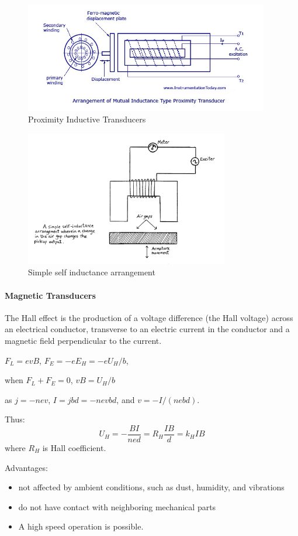 \begin{figure}
  \centering
  \includegraphics[width=4.2in]{fig/Proximity-Inductive-Transduccers.jpg}
  \caption{Proximity Inductive Transducers}\label{fig_proximity_inductive}
\end{figure}


\begin{figure}
  \centering
  \includegraphics[width=3.5in]{fig/Image22.png}
  \caption{Simple self inductance arrangement}\label{fig_inductance}
\end{figure}

\paragraph{Magnetic Transducers}
The Hall effect is the production of a voltage difference (the Hall voltage) across an electrical conductor, transverse to an electric current in the conductor and a magnetic field perpendicular to the current.

$F_L=evB$, $F_E=-eE_H=-eU_H/b$,

when $F_L+F_E=0$, $vB=U_H/b$

as $j=-nev$, $I=jbd=-nevbd$, and $v=-I/(nebd)$.

Thus:
$$U_H=-\frac{BI}{ned}=R_H\frac{IB}{d}=k_HIB$$
where $R_H$ is Hall coefficient.

Advantages:
\begin{itemize}
  \item not affected by ambient conditions, such as dust, humidity, and vibrations
  \item do not have contact with neighboring mechanical parts
  \item A high speed operation is possible.
\end{itemize}

